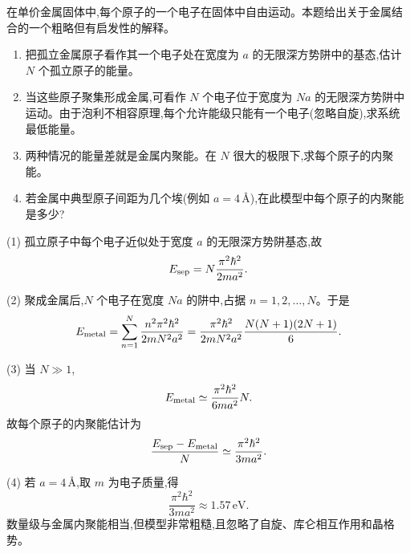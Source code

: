 \begin{question}
在单价金属固体中,每个原子的一个电子在固体中自由运动。本题给出关于金属结合的一个粗略但有启发性的解释。
\begin{enumerate}
\item 把孤立金属原子看作其一个电子处在宽度为 $a$ 的无限深方势阱中的基态,估计 $N$ 个孤立原子的能量。
\item 当这些原子聚集形成金属,可看作 $N$ 个电子位于宽度为 $Na$ 的无限深方势阱中运动。由于泡利不相容原理,每个允许能级只能有一个电子(忽略自旋),求系统最低能量。
\item 两种情况的能量差就是金属内聚能。在 $N$ 很大的极限下,求每个原子的内聚能。
\item 若金属中典型原子间距为几个埃(例如 $a=4\,\text{\AA}$),在此模型中每个原子的内聚能是多少?
\end{enumerate}
\begin{solution}
(1) 孤立原子中每个电子近似处于宽度 $a$ 的无限深方势阱基态,故
\[
E_{\rm sep}=N\frac{\pi^2\hbar^2}{2ma^2}.
\]

(2) 聚成金属后,$N$ 个电子在宽度 $Na$ 的阱中,占据 $n=1,2,\ldots,N$。于是
\[
E_{\rm metal}=\sum_{n=1}^N\frac{n^2\pi^2\hbar^2}{2mN^2a^2}
=\frac{\pi^2\hbar^2}{2mN^2a^2}\frac{N(N+1)(2N+1)}6.
\]

(3) 当 $N\gg1$,
\[
E_{\rm metal}\simeq \frac{\pi^2\hbar^2}{6ma^2}N.
\]
故每个原子的内聚能估计为
\[
\frac{E_{\rm sep}-E_{\rm metal}}{N}
\simeq \frac{\pi^2\hbar^2}{3ma^2}.
\]

(4) 若 $a=4\,\text{\AA}$,取 $m$ 为电子质量,得
\[
\frac{\pi^2\hbar^2}{3ma^2}\approx 1.57\,\mathrm{eV}.
\]
数量级与金属内聚能相当,但模型非常粗糙,且忽略了自旋、库仑相互作用和晶格势。
\end{solution}
\end{question}

